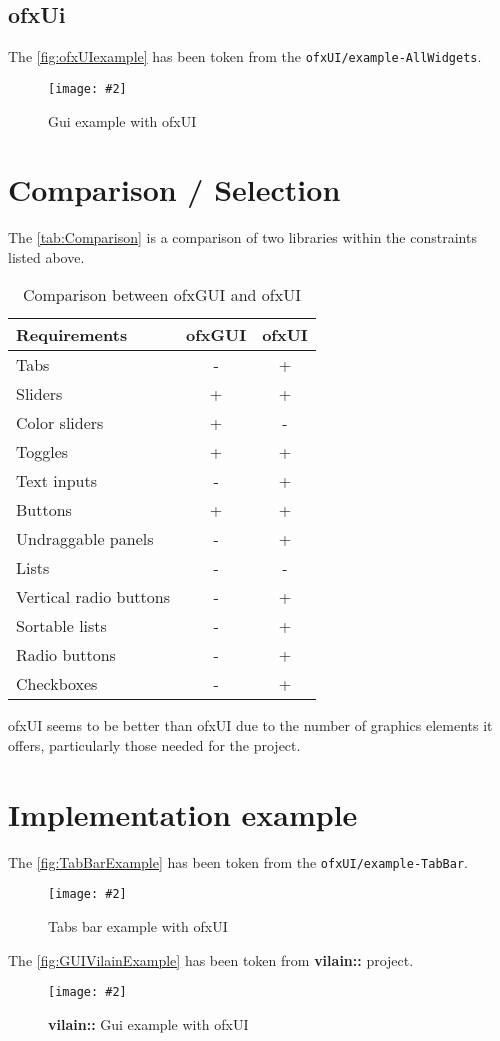 \documentclass[a4paper,titlepage,oneside]{article}
\newcommand{\image}[5][\textwidth]{%
    \begin{figure}[h]
        \centering
            \begin{minipage}[c]{#1}
                \centering
                \texttt{[image: \#2]}
                \caption{#4}
                \label{#5}
            \end{minipage}
    \end{figure}
}
\newcommand{\tableau}[4]{
	\begin{table}[h]
        \centering
        \begin{tabular}{#1}
            #4
        \end{tabular}
        \caption{#2}
        \label{#3}
    \end{table}
}
\newcommand{\vilain}{\textbf{vilain::}}
\begin{document}
\newpage
\subsection{ofxUi}
The \figurename \vref{fig:ofxUIexample} has been token from the \texttt{ofxUI/example-AllWidgets}.
\image{data/ofxUI.jpg}{width=12cm}{Gui example with ofxUI}{fig:ofxUIexample}

\newpage
\section{Comparison / Selection}
The \tablename \vref{tab:Comparison} is a comparison of two libraries within the constraints listed above.\\
\tableau{|p{4cm}|c|c|}{Comparison between ofxGUI and ofxUI}{tab:Comparison}
{
	\hline
	Requirements & ofxGUI & ofxUI\\
	\hline
	Tabs & - & + \\
	Sliders & + & + \\
	Color sliders & + & - \\
	Toggles & + & + \\
	Text inputs & - & + \\
	Buttons & + & + \\
	Undraggable panels & - & + \\
	Lists & - & - \\
	Vertical radio buttons & - & + \\
	Sortable lists & - & + \\
	Radio buttons & - & + \\
	Checkboxes & - & + \\
	\hline
}

ofxUI seems to be better than ofxUI due to the number of graphics
elements it offers, particularly those needed for the project.

\newpage
\section{Implementation example}
The \figurename \vref{fig:TabBarExample} has been token from the \texttt{ofxUI/example-TabBar}.
\image{data/TabBar.jpg}{width=5cm}{Tabs bar example with ofxUI}{fig:TabBarExample}

The \figurename \vref{fig:GUIVilainExample} has been token from \vilain{} project.
\image{data/GUIVilain.jpg}{width=13cm}{\vilain{} Gui example with ofxUI}{fig:GUIVilainExample}
\end{document}

